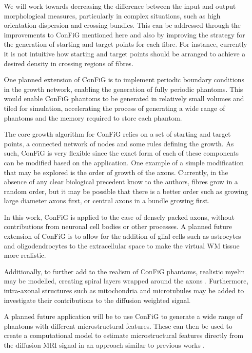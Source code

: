 We will work towards decreasing the difference between the input and output morphological measures, particularly in complex situations, such as high orientation dispersion and crossing bundles. This can be addressed through the improvements to \ac{ConFiG} mentioned here and also by improving the strategy for the generation of starting and target points for each fibre. For instance, currently it is not intuitive how starting and target points should be arranged to achieve a desired density in crossing regions of fibres.

One planned extension of \ac{ConFiG} is to implement periodic boundary conditions in the growth network, enabling the generation of fully periodic phantoms. This would enable \ac{ConFiG} phantoms to be generated in relatively small volumes and tiled for simulation, accelerating the process of generating a wide range of phantoms and the memory required to store each phantom.

The core growth algorithm for \ac{ConFiG} relies on a set of starting and target points, a connected network of nodes and some rules defining the growth. As such, \ac{ConFiG} is very flexible since the exact form of each of these components can be modified based on the application. One example of a simple modification that may be explored is the order of growth of the axons. Currently, in the absence of any clear biological precedent know to the authors, fibres grow in a random order, but it may be possible that there is a better order such as growing large diameter axons first, or central axons in a bundle growing first.

In this work, \ac{ConFiG} is applied to the case of densely packed axons, without contributions from neuronal cell bodies or other processes. A planned future extension of \ac{ConFiG} is to allow for the addition of glial cells such as astrocytes and oligodendrocytes \cite{Palombo2019} to the extracellular space to make the virtual \ac{WM} tissue more realistic.

Additionally, to further add to the realism of \ac{ConFiG} phantoms, realistic myelin may be modelled, creating spiral layers wrapped around the axons \cite{Brusini2019}. Furthermore, intra-axonal structures such as mitochondria and microtubules may be added to investigate their contributions to the diffusion weighted signal.

A planned future application will be to use \ac{ConFiG} to generate a wide range of phantoms with different microstructural features. These can then be used to create a computational model to estimate microstructural features directly from the diffusion \ac{MRI} signal in an approach similar to previous works \cite{Hill2019,Palombo2018a,Palombo2016,Nedjati-Gilani2017,Rensonnet2018}.

